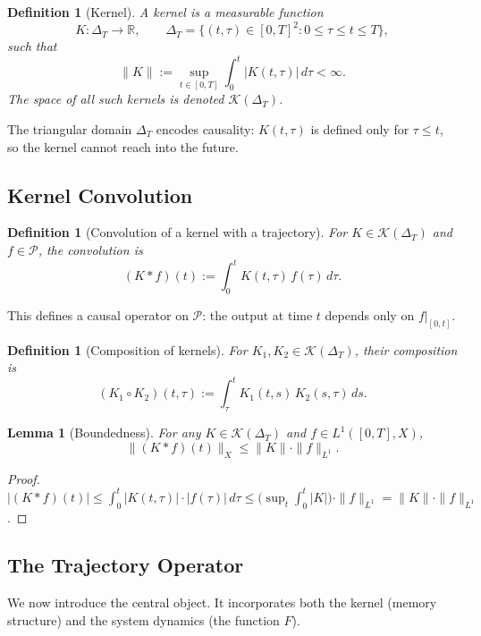 \documentclass[12pt]{article}
\newtheorem{lemma}[theorem]{Lemma}
\newtheorem{definition}[theorem]{Definition}
\newcommand{\R}{\mathbb{R}}
\newcommand{\Pcal}{\mathcal{P}}
\newcommand{\Kcal}{\mathcal{K}}
\begin{document}
\begin{definition}[Kernel]
A \emph{kernel} is a measurable function
\[
  K \colon \Delta_T \to \R,
  \qquad
  \Delta_T = \{(t,\tau) \in [0,T]^2 \colon 0 \leq \tau \leq t \leq T\},
\]
such that
\[
  \|K\| := \sup_{t \in [0,T]} \int_0^t |K(t,\tau)|\, d\tau < \infty.
\]
The space of all such kernels is denoted $\Kcal(\Delta_T)$.
\end{definition}

The triangular domain $\Delta_T$ encodes causality: $K(t,\tau)$ is defined
only for $\tau \leq t$, so the kernel cannot reach into the future.

\subsection{Kernel Convolution}

\begin{definition}[Convolution of a kernel with a trajectory]
For $K \in \Kcal(\Delta_T)$ and $f \in \Pcal$, the \emph{convolution}
is
\[
  (K * f)(t) := \int_0^t K(t,\tau)\, f(\tau)\, d\tau.
\]
\end{definition}

This defines a causal operator on $\Pcal$: the output at time $t$ depends
only on $f|_{[0,t]}$.

\begin{definition}[Composition of kernels]
For $K_1, K_2 \in \Kcal(\Delta_T)$, their \emph{composition} is
\[
  (K_1 \circ K_2)(t,\tau) := \int_\tau^t K_1(t,s)\, K_2(s,\tau)\, ds.
\]
\end{definition}

\begin{lemma}[Boundedness]
\label{lem:bounded}
For any $K \in \Kcal(\Delta_T)$ and $f \in L^1([0,T],X)$,
\[
  \|(K*f)(t)\|_X \leq \|K\|\cdot \|f\|_{L^1}.
\]
\end{lemma}

\begin{proof}
$|(K*f)(t)| \leq \int_0^t |K(t,\tau)|\cdot|f(\tau)|\,d\tau
\leq \bigl(\sup_t \int_0^t |K|\bigr)\cdot\|f\|_{L^1} = \|K\|\cdot\|f\|_{L^1}$.
\end{proof}

\subsection{The Trajectory Operator}

We now introduce the central object. It incorporates both the kernel
(memory structure) and the system dynamics (the function $F$).
\end{document}
